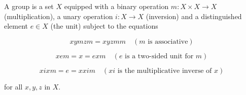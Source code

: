 A group is a set $X$ equipped with a binary operation $m: X \times X \longrightarrow X$ (multiplication), a unary operation $i: X \longrightarrow X$ (inversion) and a distinguished element $e \in X$ (the unit) subject to the equations

$$xymzm = xyzmm \quad (m \text{ is associative})$$

$$xem = x = exm \quad (e \text{ is a two-sided unit for } m)$$

$$xixm = e = xxim \quad (xi \text{ is the multiplicative inverse of } x)$$

for all $x, y, z$ in $X$.
